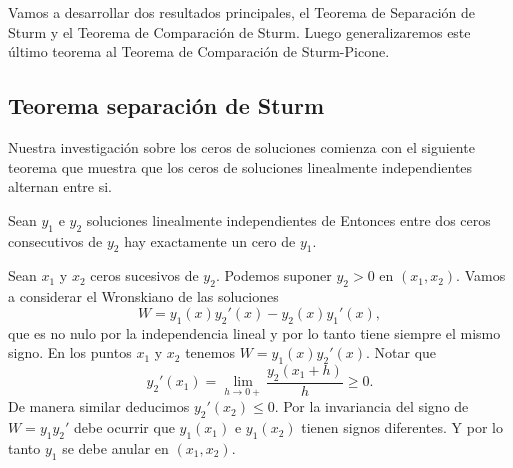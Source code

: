 Vamos a desarrollar dos resultados principales, el Teorema de Separación de Sturm y el Teorema de Comparación de Sturm. Luego generalizaremos este último teorema al Teorema de Comparación de Sturm-Picone.

\subsection{Teorema separación de Sturm}

Nuestra investigación sobre los ceros de soluciones comienza con el siguiente teorema que muestra que los ceros de soluciones linealmente independientes alternan entre si.




\begin{teorema}\label{sep_sturm} Sean $y_1$ e $y_2$ soluciones linealmente independientes de 
Entonces entre dos ceros consecutivos de $y_2$ hay exactamente un cero de $y_1$. \end{teorema}
\begin{demo} Sean $x_1$ y $x_2$ ceros sucesivos de $y_2$. Podemos suponer $y_2>0$ en $(x_1,x_2)$. Vamos a considerar el Wronskiano de las soluciones
\[W=y_1(x)y_2'(x)-y_2(x)y_1'(x),\]
que es no nulo por la independencia lineal y por lo tanto tiene siempre el  mismo signo. En los puntos $x_1$ y $x_2$ tenemos $W=y_1(x)y_2'(x)$. Notar que
\[y_2'(x_1)=\lim_{h\to 0+}\frac{y_2(x_1+h)}{h}\geq 0.\]
De  manera similar deducimos $y_2'(x_2)\leq 0$. Por la invariancia del signo de $W=y_1y_2'$ debe ocurrir que $y_1(x_1)$ e $y_1(x_2)$ tienen signos diferentes. Y por lo tanto $y_1$ se debe anular en $(x_1,x_2)$.\end{demo}

